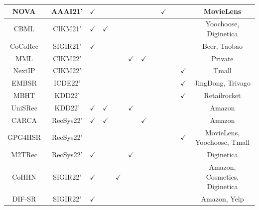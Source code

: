 \documentclass[lettersize,journal]{IEEEtran}
\begin{document}
\begin{table}[!th]
\begin{tabular}{c|c|c|c|    c|c|c|c|    c|c|c|c}
  {NOVA~\cite{liu@AAAI2021}}    & {AAAI21'}    &{$\checkmark$}    & {}   & {}   & {}  & {}   & {}  & {$\checkmark$}  & {}  & {}    & {MovieLens} \\  
 \hline
  {CBML~\cite{song@CIKM2021}}    & {CIKM21'}    &{$\checkmark$}    & {$\checkmark$}   & {}   & {}  & {}   & {}  & {}  & {}  & {}    & {Yoochoose, Diginetica} \\  
 \hline
 {CoCoRec~\cite{cai@SIGIR2021}}    & {SIGIR21'}    &{$\checkmark$}    & {}   & {}   & {}  & {}   & {}  & {}  & {}  & {}    & {Beer, Taobao} \\  
 \hline

 
 

 
 {MML~\cite{Pan@CIKM2022}} & {CIKM22'}    &{}    & {}   & {}   & {$\checkmark$}  & {$\checkmark$}   & {}  & {}  & {}  & {}    & {Private} \\  
 \hline
 {NextIP~\cite{Luo@CIKM2022}}    & {CIKM22'}    &{}    & {}   & {}   & {}  & {}   & {}  & {}  & {}  & {$\checkmark$}    & {Tmall} \\   
 \hline
 {EMBSR~\cite{Yuan@ICDE2022}}    & {ICDE22'}    &{}    & {}   & {}   & {}  & {}   & {}  & {}  & {}  & {$\checkmark$}    & {JingDong, Trivago} \\  
 \hline
 {MBHT~\cite{yang@KDD2022}}    & {KDD22'}    &{}    & {}   & {}   & {}  & {}  & {}   & {}  & {}  & {$\checkmark$}    & {Retailrocket} \\   
 \hline
 {UniSRec~\cite{hou@KDD2022}}    & {KDD22'}    &{$\checkmark$}    & {$\checkmark$}   & {}   & {$\checkmark$}  & {}   & {}  & {}  & {}  & {}    & {Amazon} \\  
 \hline
 {CARCA~\cite{Rashed@RecSys2022}}    & {RecSys22'}    &{$\checkmark$}    & {$\checkmark$}   & {}   & {}  & {$\checkmark$}   & {}  & {}  & {}  & {}    & {Amazon} \\  
 \hline
 {GPG4HSR~\cite{Chen@RecSys2022}}    & {RecSys22'}    &{}    & {}   & {}   & {}  & {}   & {}  & {}  & {}  & {$\checkmark$}    & {MovieLens, Yoochoose, Tmall} \\
 \hline
 {M2TRec~\cite{Shalaby@RecSys2022}}    & {RecSys22'}    &{$\checkmark$}    & {}   & {}   & {$\checkmark$}  & {}   & {}   & {}  & {}  & {}    & {Diginetica} \\  
 \hline
 {CoHHN~\cite{CoHHN}}    & {SIGIR22'}    &{$\checkmark$}    & {}   & {$\checkmark$}   & {}  & {}  & {}   & {}  & {}  & {}    & {Amazon, Cosmetics, Diginetica} \\  
 \hline
 {DIF-SR~\cite{xie@SIGIR2022}}    & {SIGIR22'}    &{$\checkmark$}    & {}   & {}   & {}  & {}   & {}  & {}  & {}  & {}    & {Amazon, Yelp} \\  

\end{tabular}
\end{table}
\end{document}
